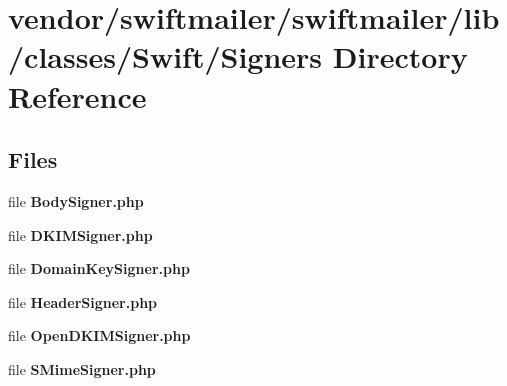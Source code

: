 \section{vendor/swiftmailer/swiftmailer/lib/classes/\+Swift/\+Signers Directory Reference}
\label{dir_c6260d95b47b657b4f99e9591873dedc}
\subsection*{Files}
\begin{DoxyCompactItemize}
\item 
file {\bf Body\+Signer.\+php}
\item 
file {\bf D\+K\+I\+M\+Signer.\+php}
\item 
file {\bf Domain\+Key\+Signer.\+php}
\item 
file {\bf Header\+Signer.\+php}
\item 
file {\bf Open\+D\+K\+I\+M\+Signer.\+php}
\item 
file {\bf S\+Mime\+Signer.\+php}
\end{DoxyCompactItemize}
